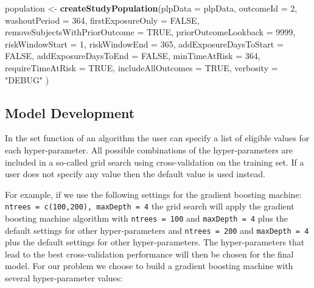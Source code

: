 \documentclass[11pt]{book}
\newenvironment{Shaded}{\begin{snugshade}}{\end{snugshade}}
\newcommand{\DataTypeTok}[1]{\textcolor[rgb]{0.13,0.29,0.53}{#1}}
\newcommand{\DecValTok}[1]{\textcolor[rgb]{0.00,0.00,0.81}{#1}}
\newcommand{\KeywordTok}[1]{\textcolor[rgb]{0.13,0.29,0.53}{\textbf{#1}}}
\newcommand{\NormalTok}[1]{#1}
\newcommand{\OtherTok}[1]{\textcolor[rgb]{0.56,0.35,0.01}{#1}}
\newcommand{\StringTok}[1]{\textcolor[rgb]{0.31,0.60,0.02}{#1}}
\theoremstyle{definition}
\theoremstyle{definition}
\theoremstyle{definition}
\theoremstyle{remark}
\begin{document}
\begin{Shaded}
\begin{Highlighting}[]
\NormalTok{population <-}\StringTok{ }\KeywordTok{createStudyPopulation}\NormalTok{(}\DataTypeTok{plpData =}\NormalTok{ plpData,}
                                    \DataTypeTok{outcomeId =} \DecValTok{2}\NormalTok{,}
                                    \DataTypeTok{washoutPeriod =} \DecValTok{364}\NormalTok{,}
                                    \DataTypeTok{firstExposureOnly =} \OtherTok{FALSE}\NormalTok{,}
                                    \DataTypeTok{removeSubjectsWithPriorOutcome =} \OtherTok{TRUE}\NormalTok{,}
                                    \DataTypeTok{priorOutcomeLookback =} \DecValTok{9999}\NormalTok{,}
                                    \DataTypeTok{riskWindowStart =} \DecValTok{1}\NormalTok{,}
                                    \DataTypeTok{riskWindowEnd =} \DecValTok{365}\NormalTok{,}
                                    \DataTypeTok{addExposureDaysToStart =} \OtherTok{FALSE}\NormalTok{,}
                                    \DataTypeTok{addExposureDaysToEnd =} \OtherTok{FALSE}\NormalTok{,}
                                    \DataTypeTok{minTimeAtRisk =} \DecValTok{364}\NormalTok{,}
                                    \DataTypeTok{requireTimeAtRisk =} \OtherTok{TRUE}\NormalTok{,}
                                    \DataTypeTok{includeAllOutcomes =} \OtherTok{TRUE}\NormalTok{,}
                                    \DataTypeTok{verbosity =} \StringTok{"DEBUG"}
\NormalTok{)}
\end{Highlighting}
\end{Shaded}

\hypertarget{model-development}{%
\subsection{Model Development}\label{model-development}}

In the set function of an algorithm the user can specify a list of eligible values for each hyper-parameter. All possible combinations of the hyper-parameters are included in a so-called grid search using cross-validation on the training set. If a user does not specify any value then the default value is used instead.

For example, if we use the following settings for the gradient boosting machine: \texttt{ntrees\ =\ c(100,200),\ maxDepth\ =\ 4} the grid search will apply the gradient boosting machine algorithm with \texttt{ntrees\ =\ 100} and \texttt{maxDepth\ =\ 4} plus the default settings for other hyper-parameters and \texttt{ntrees\ =\ 200} and \texttt{maxDepth\ =\ 4} plus the default settings for other hyper-parameters. The hyper-parameters that lead to the best cross-validation performance will then be chosen for the final model. For our problem we choose to build a gradient boosting machine with several hyper-parameter values:
\end{document}

